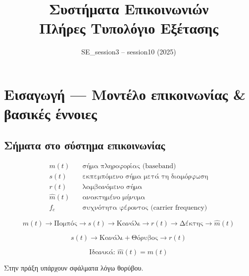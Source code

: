 \documentclass[11pt,a4paper]{article}
\title{\textbf{Συστήματα Επικοινωνιών}\\Πλήρες Τυπολόγιο Εξέτασης}
\author{SE\_session3 -- session10 (2025)}
\date{}
\begin{document}
\maketitle
\tableofcontents
\newpage

\section{Εισαγωγή — Μοντέλο επικοινωνίας \& βασικές έννοιες}

\subsection{Σήματα στο σύστημα επικοινωνίας}

\begin{align}
m(t) &\quad \text{σήμα πληροφορίας (baseband)} \\
s(t) &\quad \text{εκπεμπόμενο σήμα μετά τη διαμόρφωση} \\
r(t) &\quad \text{λαμβανόμενο σήμα} \\
\hat{m}(t) &\quad \text{ανακτημένο μήνυμα} \\
f_c &\quad \text{συχνότητα φέροντος (carrier frequency)}
\end{align}

\begin{equation}
m(t) \to \text{Πομπός} \to s(t) \to \text{Κανάλι} \to r(t) \to \text{Δέκτης} \to \hat{m}(t)
\end{equation}

\begin{equation}
s(t) \to \text{Κανάλι} + \text{Θόρυβος} \to r(t)
\end{equation}

\begin{center}
\end{center}

\begin{equation}
\text{Ιδανικά: } \hat{m}(t) = m(t)
\end{equation}

Στην πράξη υπάρχουν σφάλματα λόγω θορύβου.
\end{document}
